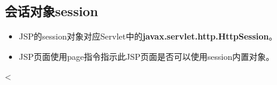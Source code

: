 \subsection{会话对象session} 

\begin{itemize}
\item JSP的session对象对应Servlet中的{\bf\Blue javax.servlet.http.HttpSession}。
\item JSP页面使用page指令指示此JSP页面是否可以使用session内置对象。
\end{itemize}

\begin{jspCode}
  <%
\end{jspCode}

%
%

